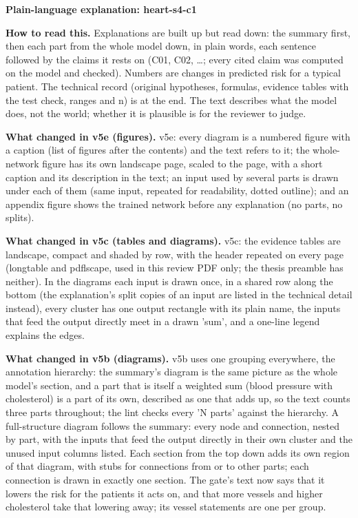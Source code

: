 \documentclass[a4paper,10pt]{article}
\begin{document}
\begin{center}{\Large\bfseries Plain-language explanation: heart-s4-c1\par}\vspace{2mm}{\small AI-assisted drafts for review. Nothing here has been verified by a person.\par}\end{center}
\noindent\textbf{How to read this.} Explanations are built up but read down: the summary first, then each part from the whole model down, in plain words, each sentence followed by the claims it rests on (C01, C02, \ldots; every cited claim was computed on the model and checked). Numbers are changes in predicted risk for a typical patient. The technical record (original hypotheses, formulas, evidence tables with the test check, ranges and n) is at the end. The text describes what the model does, not the world; whether it is plausible is for the reviewer to judge.
\par\medskip\noindent\textbf{What changed in v5e (figures).} v5e: every diagram is a numbered figure with a caption (list of figures after the contents) and the text refers to it; the whole-network figure has its own landscape page, scaled to the page, with a short caption and its description in the text; an input used by several parts is drawn under each of them (same input, repeated for readability, dotted outline); and an appendix figure shows the trained network before any explanation (no parts, no splits).
\par\medskip\noindent\textbf{What changed in v5c (tables and diagrams).} v5c: the evidence tables are landscape, compact and shaded by row, with the header repeated on every page (longtable and pdflscape, used in this review PDF only; the thesis preamble has neither). In the diagrams each input is drawn once, in a shared row along the bottom (the explanation's split copies of an input are listed in the technical detail instead), every cluster has one output rectangle with its plain name, the inputs that feed the output directly meet in a drawn 'sum', and a one-line legend explains the edges.
\par\medskip\noindent\textbf{What changed in v5b (diagrams).} v5b uses one grouping everywhere, the annotation hierarchy: the summary's diagram is the same picture as the whole model's section, and a part that is itself a weighted sum (blood pressure with cholesterol) is a part of its own, described as one that adds up, so the text counts three parts throughout; the lint checks every 'N parts' against the hierarchy. A full-structure diagram follows the summary: every node and connection, nested by part, with the inputs that feed the output directly in their own cluster and the unused input columns listed. Each section from the top down adds its own region of that diagram, with stubs for connections from or to other parts; each connection is drawn in exactly one section. The gate's text now says that it lowers the risk for the patients it acts on, and that more vessels and higher cholesterol take that lowering away; its vessel statements are one per group.
\end{document}
